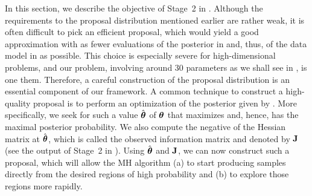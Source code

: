 In this section, we describe the objective of Stage~2 in .
Although the requirements to the proposal distribution mentioned earlier are rather weak, it is often difficult to pick an efficient proposal, which would yield a good approximation with as fewer evaluations of the posterior in  and, thus, of the data model in  as possible.
This choice is especially severe for high-dimensional problems, and our problem, involving around 30 parameters as we shall see in , is one them.
Therefore, a careful construction of the proposal distribution is an essential component of our framework.
A common technique to construct a high-quality proposal is to perform an optimization of the posterior given by .
More specifically, we seek for such a value $\hat{{\boldsymbol\theta}}$ of ${\boldsymbol\theta}$ that maximizes  and, hence, has the maximal posterior probability.
We also compute the negative of the Hessian matrix at $\hat{{\boldsymbol\theta}}$, which is called the observed information matrix and denoted by $\mathbf{J}$ (see the output of Stage~2 in ).
Using $\hat{{\boldsymbol\theta}}$ and $\mathbf{J}$, we can now construct such a proposal, which will allow the MH algorithm (a) to start producing samples directly from the desired regions of high probability and (b) to explore those regions more rapidly.
